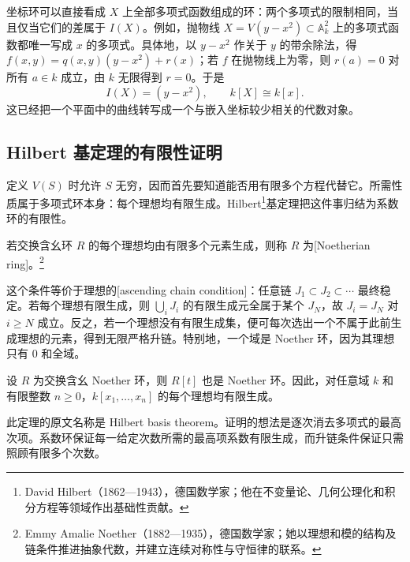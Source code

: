 坐标环可以直接看成 \(X\) 上全部多项式函数组成的环：两个多项式的限制相同，当且仅当它们的差属于 \(I(X)\)。例如，抛物线 \(X=V(y-x^2)\subset\mathbb A_k^2\) 上的多项式函数都唯一写成 \(x\) 的多项式。具体地，以 \(y-x^2\) 作关于 \(y\) 的带余除法，得 \(f(x,y)=q(x,y)(y-x^2)+r(x)\)；若 \(f\) 在抛物线上为零，则 \(r(a)=0\) 对所有 \(a\in k\) 成立，由 \(k\) 无限得到 \(r=0\)。于是
\[
	I(X)=(y-x^2),\qquad k[X]\cong k[x].
\]
这已经把一个平面中的曲线转写成一个与嵌入坐标较少相关的代数对象。

\subsection{Hilbert 基定理的有限性证明}
\label{g5:subsec:0101:02}

定义 \(V(S)\) 时允许 \(S\) 无穷，因而首先要知道能否用有限多个方程代替它。所需性质属于多项式环本身：每个理想均有限生成。Hilbert\footnote{David Hilbert（1862—1943），德国数学家；他在不变量论、几何公理化和积分方程等领域作出基础性贡献。}基定理把这件事归结为系数环的有限性。

\begin{definition}\label{g5:def:noetherian-ring}
	若交换含幺环 \(R\) 的每个理想均由有限多个元素生成，则称 \(R\) 为[Noetherian ring]。\footnote{Emmy Amalie Noether（1882—1935），德国数学家；她以理想和模的结构及链条件推进抽象代数，并建立连续对称性与守恒律的联系。}
\end{definition}

这个条件等价于理想的[ascending chain condition]：任意链 \(J_1\subset J_2\subset\cdots\) 最终稳定。若每个理想有限生成，则 \(\bigcup_iJ_i\) 的有限生成元全属于某个 \(J_N\)，故 \(J_i=J_N\) 对 \(i\geq N\) 成立。反之，若一个理想没有有限生成集，便可每次选出一个不属于此前生成理想的元素，得到无限严格升链。特别地，一个域是 Noether 环，因为其理想只有 \(0\) 和全域。

\begin{theorem}\label{g5:thm:hilbert-basis}
	设 \(R\) 为交换含幺 Noether 环，则 \(R[t]\) 也是 Noether 环。因此，对任意域 \(k\) 和有限整数 \(n\geq0\)，\(k[x_1,\ldots,x_n]\) 的每个理想均有限生成。
\end{theorem}

此定理的原文名称是 Hilbert basis theorem。证明的想法是逐次消去多项式的最高次项。系数环保证每一给定次数所需的最高项系数有限生成，而升链条件保证只需照顾有限多个次数。

